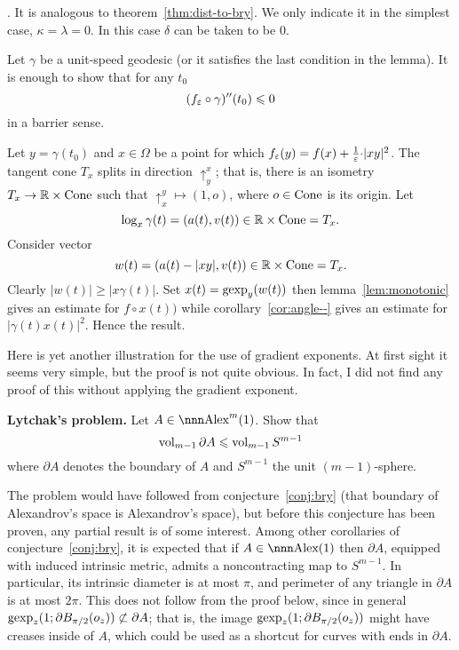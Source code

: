 \documentclass{article}
\begin{document}
\Proof. 
It is analogous to theorem~\ref{thm:dist-to-bry}. 
We only indicate it in the simplest case, $\kappa=\lambda=0$. 
In this case $\delta$ can be taken to be $0$.

Let $\gamma$ be a unit-speed geodesic (or it satisfies the last condition in the lemma). 
It is enough to show that for any $t_0$
$$(f_\varepsilon\circ\gamma)''(t_0)\leqslant0$$
in a barrier sense. 

Let $y=\gamma(t_0)$ and $x\in \Omega$ be a point for which 
$f_\varepsilon(y)=f(x)+\tfrac1{\varepsilon}{\cdot}|x y|^2$.
The tangent cone $T_x$ splits in direction $\uparrow_y^x$;
that is, there is an isometry $T_x\to \mathbb{R}\times \operatorname{Cone}$ such that $\uparrow_x^y\mapsto(1,o)$, 
where $o\in\operatorname{Cone}$ is its origin.
Let 
$$\log_x\gamma(t)=(a(t),v(t))\in\mathbb{R}\times \operatorname{Cone}=T_x.$$
Consider vector 
$$w(t)=(a(t)-|x y|,v(t))\in \mathbb{R}\times \operatorname{Cone}=T_x.$$ 
Clearly $|w(t)|\ge|x\gamma(t)|$.
Set $x(t)=\operatorname{gexp}_y(w(t))$ then lemma~\ref{lem:monotonic} gives an estimate for $f\circ x(t))$ while corollary~\ref{cor:angle--} gives an estimate for $|\gamma(t)x(t)|^2$. Hence the result.
\qeds




Here is yet another illustration for the use of gradient exponents.
At first sight it seems very simple, but the proof is not quite obvious.
In fact, I did not find any proof of this without applying the gradient exponent. 

\begin{thm} {\bf Lytchak's problem.}\label{lyt-prob} Let $A\in\Alex^m(1)$. 
Show
that
$$\operatorname{vol}_{m-1}\partial A\leqslant \operatorname{vol}_{m-1}S^{m-1}$$
where $\partial A$ denotes the boundary of $A$ and $S^{m-1}$ the unit $(m-1)$-sphere.
\end{thm}

The problem would have followed from conjecture~\ref{conj:bry}
(that boundary of Alexandrov's space is Alexandrov's space), but before this conjecture has been proven, any partial
result is of some interest.
Among other corollaries of
conjecture~\ref{conj:bry}, it is expected that if $A\in \Alex(1)$ then $\partial
A$, equipped with induced intrinsic metric, admits a noncontracting map to
$S^{m-1}$. 
In particular, its intrinsic diameter is at most $\pi$, and perimeter
of any triangle in $\partial A$ is at most $2\pi$. 
This does not follow from the proof below, 
since in general 
$\operatorname{gexp}_z(1;\partial B_{\pi/2}(o_z))\not\subset\partial A$;
that is, the image $\operatorname{gexp}_z(1;\partial B_{\pi/2}(o_z))$
might have creases inside of $A$, 
which could be used as a shortcut for
curves with ends in $\partial A$.
\end{document}
